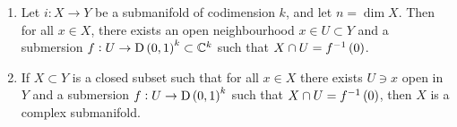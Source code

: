 \begin{theorem}
\label{thm:3.11}
\hfill
\begin{enumerate}
\item Let $ i : X \to Y $ be a submanifold of codimension $ k $, and let $ n = \dim X $. Then for all $ x \in X $, there exists an open neighbourhood $ x \in U \subset Y $ and a submersion $ f : U \to \D\br{0, 1}^k \subset \CC^k $ such that $ X \cap U = f^{-1}\br{0} $.
\item If $ X \subset Y $ is a closed subset such that for all $ x \in X $ there exists $ U \ni x $ open in $ Y $ and a submersion $ f : U \to \D\br{0, 1}^k $ such that $ X \cap U = f^{-1}\br{0} $, then $ X $ is a complex submanifold.
\end{enumerate}
\end{theorem}

